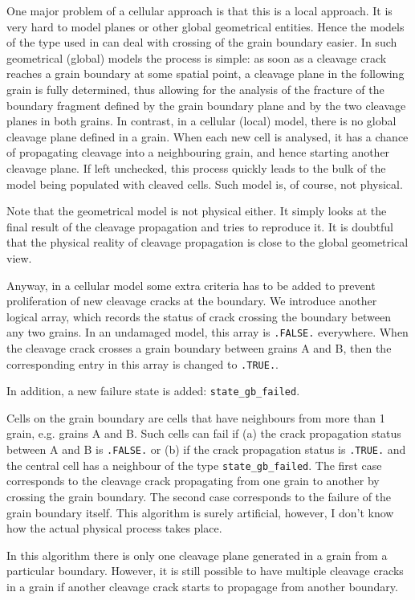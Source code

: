 One major problem of a cellular
approach is that this is a local
approach.
It is very hard to model planes or
other global geometrical entities.
Hence the models of the type used
in \cite{smith2012} can deal with crossing
of the grain boundary easier.
In such geometrical (global) models
the process is simple: as soon as a
cleavage crack reaches a grain boundary
at some spatial point, a cleavage plane
in the following grain is fully determined,
thus allowing for the analysis of the
fracture of the boundary fragment
defined by the grain boundary plane
and by the two cleavage planes in both
grains.
In contrast, in a cellular (local) model,
there is no global cleavage plane defined
in a grain.
When each new cell is analysed, it has
a chance of propagating cleavage into
a neighbouring grain, and hence starting
another cleavage plane.
If left unchecked, this process quickly
leads to the bulk of the model being
populated with cleaved cells.
Such model is, of course, not physical.

Note that the geometrical model is not
physical either.
It simply looks at the final result of
the cleavage propagation and tries to
reproduce it.
It is doubtful that the physical reality
of cleavage propagation is close to
the global geometrical view.

Anyway, in a cellular model some extra
criteria has to be added to prevent
proliferation of new cleavage cracks
at the boundary.
We introduce another logical array,
which records the status of crack
crossing the boundary between any
two grains.
In an undamaged model, this array
is \texttt{.FALSE.} everywhere.
When the cleavage crack crosses a grain
boundary between grains A and B,
then the corresponding entry in this
array
is changed to \texttt{.TRUE.}.

In addition, a new failure state is
added: \texttt{state\_gb\_failed}.

Cells on the grain boundary are cells that
have neighbours from more than 1 grain,
e.g. grains A and B.
Such cells can fail if (a) the crack propagation
status between A and B is \texttt{.FALSE.}
or (b)
if the crack propagation status is \texttt{.TRUE.}
and the central cell has a neighbour of the type
\texttt{state\_gb\_failed}.
The first case corresponds to the cleavage
crack propagating from one grain to another by
crossing the grain boundary.
The second case corresponds to the failure of the
grain boundary itself.
This algorithm is surely artificial, however,
I don't know how the actual physical process
takes place.

In this algorithm there is only one cleavage
plane generated in a grain from a particular
boundary.
However, it is still possible to have multiple
cleavage cracks in a grain if another cleavage
crack starts to propagage from another boundary.
